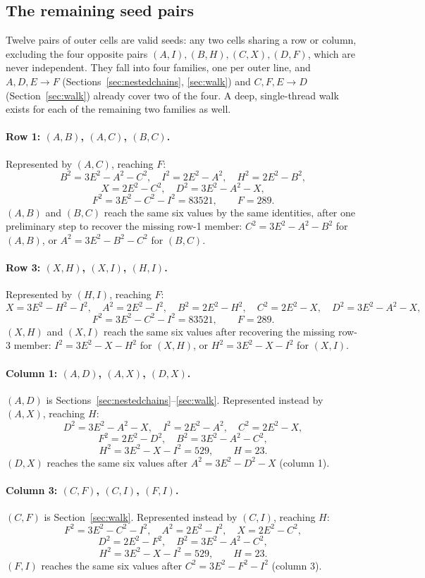 \documentclass[12pt]{article}
\theoremstyle{remark}
\begin{document}
\subsection*{The remaining seed pairs}

Twelve pairs of outer cells are valid seeds: any two cells sharing a
row or column, excluding the four opposite pairs
$(A,I),(B,H),(C,X),(D,F)$, which are never independent. They fall into
four families, one per outer line, and $A,D,E \to F$
(Sections~\ref{sec:nestedchains}, \ref{sec:walk}) and
$C,F,E \to D$ (Section~\ref{sec:walk}) already cover two of the four.
A deep, single-thread walk exists for each of the remaining two
families as well.

\paragraph{Row 1: $(A,B)$, $(A,C)$, $(B,C)$.} Represented by $(A,C)$,
reaching $F$:
\[
B^2 = 3E^2-A^2-C^2, \quad I^2=2E^2-A^2, \quad H^2=2E^2-B^2,
\]
\[
X=2E^2-C^2, \quad D^2=3E^2-A^2-X,
\]
\[
F^2 = 3E^2-C^2-I^2 = 83521, \qquad F = 289 .
\]
$(A,B)$ and $(B,C)$ reach the same six values by the same identities,
after one preliminary step to recover the missing row-1 member:
$C^2=3E^2-A^2-B^2$ for $(A,B)$, or $A^2=3E^2-B^2-C^2$ for $(B,C)$.

\paragraph{Row 3: $(X,H)$, $(X,I)$, $(H,I)$.} Represented by $(H,I)$,
reaching $F$:
\[
X = 3E^2-H^2-I^2, \quad A^2=2E^2-I^2, \quad B^2=2E^2-H^2, \quad
C^2=2E^2-X, \quad D^2=3E^2-A^2-X,
\]
\[
F^2 = 3E^2-C^2-I^2 = 83521, \qquad F = 289 .
\]
$(X,H)$ and $(X,I)$ reach the same six values after recovering the
missing row-3 member: $I^2=3E^2-X-H^2$ for $(X,H)$, or
$H^2=3E^2-X-I^2$ for $(X,I)$.

\paragraph{Column 1: $(A,D)$, $(A,X)$, $(D,X)$.} $(A,D)$ is
Sections~\ref{sec:nestedchains}--\ref{sec:walk}. Represented instead
by $(A,X)$, reaching $H$:
\[
D^2 = 3E^2-A^2-X, \quad I^2=2E^2-A^2, \quad C^2=2E^2-X,
\]
\[
F^2=2E^2-D^2, \quad B^2=3E^2-A^2-C^2,
\]
\[
H^2 = 3E^2-X-I^2 = 529, \qquad H = 23 .
\]
$(D,X)$ reaches the same six values after $A^2=3E^2-D^2-X$ (column 1).

\paragraph{Column 3: $(C,F)$, $(C,I)$, $(F,I)$.} $(C,F)$ is
Section~\ref{sec:walk}. Represented instead by $(C,I)$, reaching $H$:
\[
F^2 = 3E^2-C^2-I^2, \quad A^2=2E^2-I^2, \quad X=2E^2-C^2,
\]
\[
D^2=2E^2-F^2, \quad B^2=3E^2-A^2-C^2,
\]
\[
H^2 = 3E^2-X-I^2 = 529, \qquad H = 23 .
\]
$(F,I)$ reaches the same six values after $C^2=3E^2-F^2-I^2$
(column 3).
\end{document}
